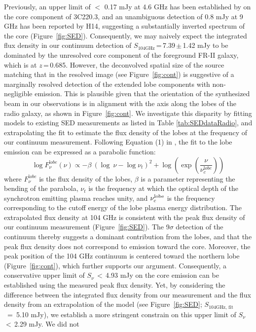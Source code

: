 \documentclass[twocolumn,apj,numberedappendix]{emulateapj}
\begin{document}
Previously,  an upper
limit of $<$ 0.17 mJy at 4.6 GHz has been established by \citet{Mullin06a} on the core component of 3C220.3, and an unambiguous detection of 0.8 mJy at 9 GHz has been reported by H14, suggesting a substantially inverted spectrum of the core (Figure~\ref{fig:SED}).
Consequently, we may naively expect the integrated flux density in our continuum detection of $S_\textrm{104GHz}$\,=\,7.39\,$\pm$\,1.42\,\,mJy to be dominated by the unresolved core component of the foreground FR-II galaxy, which is at $z$\,=\,0.685.
However, the deconvolved spatial size of the source matching that in the resolved image (see Figure~\ref{fig:cont}) is
suggestive of a marginally resolved detection of the extended lobe components with non-negligible emission.
This is plausible given that the orientation of the synthesized beam in our observations is in alignment with the
axis along the
lobes of the radio galaxy, as shown in Figure~\ref{fig:cont}. We investigate this disparity by fitting models to
existing SED measurements as listed in Table \ref{tab:SEDdataRadio}, and extrapolating the fit to
estimate the flux density of the lobes at the frequency of our continuum measurement.
%
Following Equation (1) in \citet{Cleary07a}, the fit to the lobe emission can be expressed as a parabolic function:
\begin{equation}
\log F_{\nu}^{\mathrm lobe} (\nu) \propto - \beta\ (\log\ \nu - \log \nu_{t})^2  + \log (\exp({\frac{\nu}{\nu_c^{\mathrm lobe}}}))
\end{equation}
where $F_{\nu}^{\mathrm lobe}$ is the flux density of the lobes, $\beta$ is a parameter representing the bending
of the parabola, $\nu_t$ is the frequency at which the optical depth of the synchrotron emitting plasma reaches
unity, and $\nu_c^{\rm lobe}$ is the frequency corresponding to the cutoff energy of the lobe plasma energy
distribution. 
The extrapolated flux density at 104\,\,GHz is consistent with the peak flux density of our continuum
measurement (Figure~\ref{fig:SED}). The 9$\sigma$ detection of the continuum thereby suggests a
dominant contribution from the lobes, and that the peak flux density does not correspond to emission toward
the core. Moreover, the peak position of the 104\,\,GHz continuum is
centered toward the northern lobe (Figure~\ref{fig:cont}), which further supports our argument. 
Consequently, a conservative upper limit of $S_\nu$\,$<$\,4.93 mJy on the core emission can be established using the measured peak flux density. Yet, by considering the 
difference between the integrated flux density from our measurement and the flux density from an extrapolation of the model (see Figure~\ref{fig:SED}; $S_\textrm{104GHz, fit}$~=~5.10 mJy), we establish a more stringent constrain on this upper limit of $S_\nu$\,$<$\,2.29 mJy. We did not 
\end{document}

